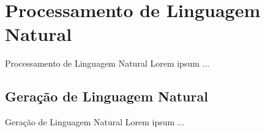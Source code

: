 \section{Processamento de Linguagem Natural}
\label{s.nlp}

\begin{frame}{Processamento de Linguagem Natural}
	Lorem ipsum ...
\end{frame}

\subsection{Geração de Linguagem Natural}
\label{ss.gln}

\begin{frame}{Geração de Linguagem Natural}
	Lorem ipsum ...
\end{frame}